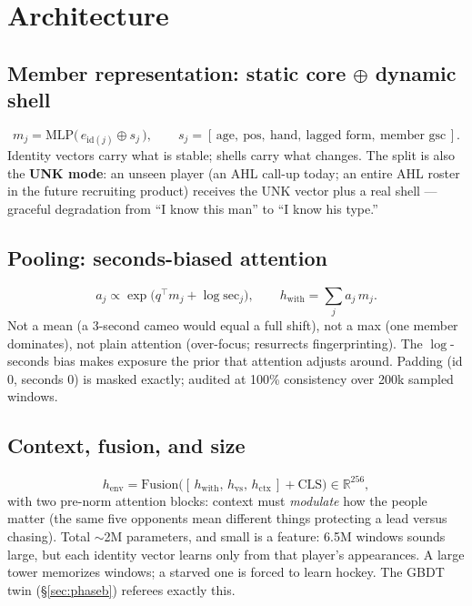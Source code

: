 \documentclass[11pt]{article}
\newcommand{\henv}{\ensuremath{h_{\mathrm{env}}}}
\begin{document}
\section{Architecture}
\subsection{Member representation: static core $\oplus$ dynamic shell}
\begin{equation}
m_j = \mathrm{MLP}\big(\, e_{\mathrm{id}(j)} \oplus s_j \,\big), \qquad
s_j = [\,\text{age},\ \text{pos},\ \text{hand},\ \text{lagged form},\
\text{member gsc}\,].
\end{equation}
Identity vectors carry what is stable; shells carry what changes. The split is
also the \textbf{UNK mode}: an unseen player (an AHL call-up today; an entire
AHL roster in the future recruiting product) receives the UNK vector plus a
real shell --- graceful degradation from ``I know this man'' to ``I know his
type.''

\subsection{Pooling: seconds-biased attention}
\label{sec:pool}
\begin{equation}
a_j \propto \exp\big( q^\top m_j + \log \mathrm{sec}_j \big), \qquad
h_{\mathrm{with}} = \textstyle\sum_j a_j\, m_j .
\end{equation}
Not a mean (a 3-second cameo would equal a full shift), not a max (one member
dominates), not plain attention (over-focus; resurrects fingerprinting). The
$\log$-seconds bias makes exposure the prior that attention adjusts around.
Padding (id 0, seconds 0) is masked exactly; audited at 100\% consistency over
200k sampled windows.

\subsection{Context, fusion, and size}
\begin{equation}
\henv = \mathrm{Fusion}\big([\, h_{\mathrm{with}},\, h_{\mathrm{vs}},\,
h_{\mathrm{ctx}} \,] + \mathrm{CLS}\big) \in \mathbb{R}^{256},
\end{equation}
with two pre-norm attention blocks: context must \emph{modulate} how the people
matter (the same five opponents mean different things protecting a lead versus
chasing). Total $\sim$2M parameters, and small is a feature: 6.5M windows
sounds large, but each identity vector learns only from that player's
appearances. A large tower memorizes windows; a starved one is forced to learn
hockey. The GBDT twin (\S\ref{sec:phaseb}) referees exactly this.
\end{document}
